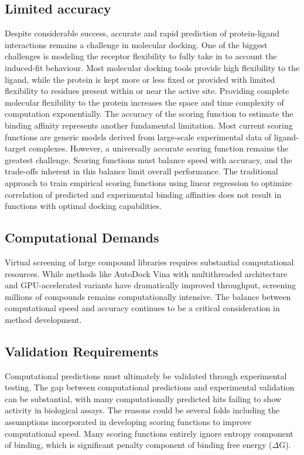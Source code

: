 \documentclass[12pt, a4paper]{article}
\begin{document}
\subsection{Limited accuracy}
Despite considerable success, accurate and rapid prediction of protein-ligand interactions remains a challenge in molecular docking. One of the biggest challenges is modeling the receptor flexibility to fully take in to account the induced-fit behaviour. Most molecular docking tools provide high flexibility to the ligand, while the protein is kept more or less fixed or provided with limited flexibility to residues present within or near the active site. Providing complete molecular flexibility to the protein increases the space and time complexity of computation exponentially. The accuracy of the scoring function to estimate the binding affinity represents another fundamental limitation. Most current scoring functions are generic models derived from large-scale experimental data of ligand-target complexes. However, a universally accurate scoring function remains the greatest challenge. Scoring functions must balance speed with accuracy, and the trade-offs inherent in this balance limit overall performance. The traditional approach to train empirical scoring functions using linear regression to optimize correlation of predicted and experimental binding affinities does not result in functions with optimal docking capabilities\cite{CH1_21}.

\subsection{Computational Demands}
Virtual screening of large compound libraries requires substantial computational resources. While methods like AutoDock Vina with multithreaded architecture and GPU-accelerated variants have dramatically improved throughput, screening millions of compounds remains computationally intensive. The balance between computational speed and accuracy continues to be a critical consideration in method development\cite{CH1_22, CH1_23}.

\subsection{Validation Requirements}
Computational predictions must ultimately be validated through experimental testing. The gap between computational predictions and experimental validation can be substantial, with many computationally predicted hits failing to show activity in biological assays. The reasons could be several folds including the assumptions incorporated in developing scoring functions to improve computational speed. Many scoring functions entirely ignore entropy component of binding, which is significant penalty component of binding free energy ($\Delta$G).
\end{document}
